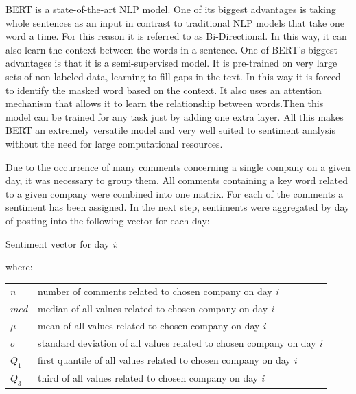 \documentclass[11pt]{article} %
\makeatletter
\newenvironment{conditions}
  {\par\vspace{\abovedisplayskip}\noindent\begin{tabular}{>{$}l<{$} @{${}={}$} l}}
  {\end{tabular}\par\vspace{\belowdisplayskip}}
\makeatother
\begin{document}
BERT is a state-of-the-art NLP model. One of its biggest advantages is taking whole sentences as an input in contrast to traditional NLP models that take one word a time. For this reason it is referred to as Bi-Directional. In this way, it can also learn the context between the words in a sentence. One of BERT's biggest advantages is that it is a semi-supervised model. It is pre-trained on very large sets of non labeled data, learning to fill gaps in the text. In this way it is forced to identify the masked word based on the context. It also uses an attention mechanism that allows it to learn the relationship between words.Then this model can be trained for any task just by adding one extra layer.  All this makes BERT an extremely versatile model and very well suited to sentiment analysis without the need for large computational resources. 


Due to the occurrence of many comments concerning a single company on a given day, it was necessary to group them. All comments containing a key word related to a given company were combined into one matrix. For each of the comments a sentiment has been assigned. In the next step, sentiments were aggregated by day of posting into the following vector for each day: 
\begin{center}   Sentiment vector for day \emph{i}:\end{center}
\begin{equation} [n, \mu, \sigma, med, Q_1, Q_3] \end{equation}
where:
\begin{conditions}
 n     &  number of comments related to chosen company on day \emph{i}\\
 med     &  median of all values related to chosen company on day \emph{i} \\  
\mu    &  mean of all values related to chosen company on day \emph{i} \\    
\sigma    &  standard deviation of all values related to chosen company on day \emph{i} \\   
Q_1     &  first quantile of all values related to chosen company on day \emph{i} \\   
Q_3     &  third of all values related to chosen company on day \emph{i} \\   
\end{conditions}
\end{document}
